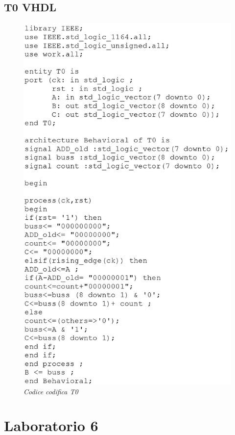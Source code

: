 \subsection{T0 VHDL}
\begin{figure}[!htb]
	\centering
	\includegraphics[scale=0.25]{immagini/t0}
	\caption{\textit{Codice codifica T0}}
	\label{t0}
\end{figure}
\newpage
\section{Laboratorio 6}
